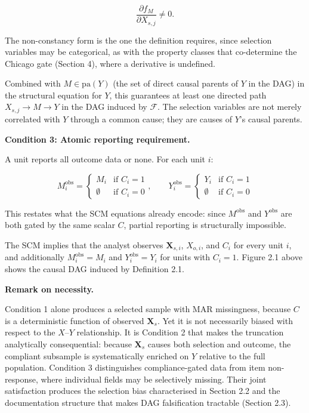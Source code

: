 \[
\frac{\partial f_M}{\partial X_{s,j}} \neq 0.
\]

The non-constancy form is the one the definition requires, since selection variables may be categorical, as with the property classes that co-determine the Chicago gate (Section 4), where a derivative is undefined.

Combined with $M \in \mathrm{pa}(Y)$ (the set of direct causal parents of $Y$ in the DAG) in the structural equation for $Y$, this guarantees at least one directed path $X_{s,j} \rightarrow M \rightarrow Y$ in the DAG induced by $\mathcal{F}$. The selection variables are not merely correlated with $Y$ through a common cause; they are causes of $Y$'s causal parents.

\textbf{Condition 3: Atomic reporting requirement.}

A unit reports all outcome data or none. For each unit $i$:

\[
M_i^{\text{obs}} = \begin{cases} M_i & \text{if } C_i = 1 \\ \emptyset & \text{if } C_i = 0 \end{cases}, \qquad Y_i^{\text{obs}} = \begin{cases} Y_i & \text{if } C_i = 1 \\ \emptyset & \text{if } C_i = 0 \end{cases}
\]

This restates what the SCM equations already encode: since $M^{\text{obs}}$ and $Y^{\text{obs}}$ are both gated by the same scalar $C$, partial reporting is structurally impossible.

The SCM implies that the analyst observes $\mathbf{X}_{s,i}$, $X_{o,i}$, and $C_i$ for every unit $i$, and additionally $M_i^{\text{obs}} = M_i$ and $Y_i^{\text{obs}} = Y_i$ for units with $C_i = 1$. Figure 2.1 above shows the causal DAG induced by Definition 2.1.

\textbf{Remark on necessity.}

Condition 1 alone produces a selected sample with MAR missingness, because $C$ is a deterministic function of observed $\mathbf{X}_s$. Yet it is not necessarily biased with respect to the $X$--$Y$ relationship. It is Condition 2 that makes the truncation analytically consequential: because $\mathbf{X}_s$ causes both selection and outcome, the compliant subsample is systematically enriched on $Y$ relative to the full population. Condition 3 distinguishes compliance-gated data from item non-response, where individual fields may be selectively missing. Their joint satisfaction produces the selection bias characterised in Section 2.2 and the documentation structure that makes DAG falsification tractable (Section 2.3).

